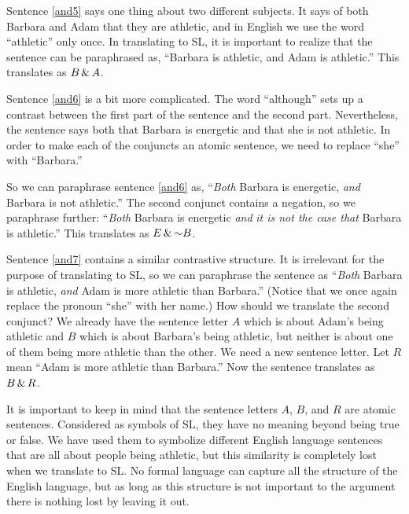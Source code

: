 
Sentence \ref{and5} says one thing about two different subjects. It says of both Barbara and Adam that they are athletic, and in English we use the word ``athletic'' only once. In translating to SL, it is important to realize that the sentence can be paraphrased as, ``Barbara is athletic, and Adam is athletic.'' This translates as $B \,\&\, A$.

Sentence \ref{and6} is a bit more complicated. The word ``although'' sets up a contrast between the first part of the sentence and the second part. Nevertheless, the sentence says both that Barbara is energetic and that she is not athletic. In order to make each of the conjuncts an atomic sentence, we need to replace ``she'' with ``Barbara.''

So we can paraphrase sentence \ref{and6} as, ``\emph{Both} Barbara is energetic, \emph{and} Barbara is not athletic.'' The second conjunct contains a negation, so we paraphrase further: ``\emph{Both} Barbara is energetic \emph{and} \emph{it is not the case that} Barbara is athletic.'' This translates as $E \,\&\, \mathord{\sim} B$.

Sentence \ref{and7} contains a similar contrastive structure. It is irrelevant for the purpose of translating to SL, so we can paraphrase the sentence as ``\emph{Both} Barbara is athletic, \emph{and} Adam is more athletic than Barbara.'' (Notice that we once again replace the pronoun ``she'' with her name.) How should we translate the second conjunct? We already have the sentence letter $A$ which is about Adam's being athletic and $B$ which is about Barbara's being athletic, but neither is about one of them being more athletic than the other. We need a new sentence letter. Let $R$ mean ``Adam is more athletic than Barbara.'' Now the sentence translates as $B \,\&\, R$.


It is important to keep in mind that the sentence letters $A$, $B$, and $R$ are atomic sentences. Considered as symbols of SL, they have no meaning beyond being true or false. We have used them to symbolize different English language sentences that are all about people being athletic, but this similarity is completely lost when we translate to SL. No formal language can capture all the structure of the English language, but as long as this structure is not important to the argument there is nothing lost by leaving it out.

